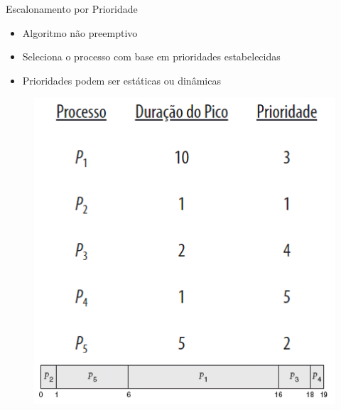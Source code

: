 \documentclass[aspectratio=169,
				xcolor=table]{beamer}
\begin{document}
	
	\begin{frame}{Escalonamento por Prioridade}
		\begin{itemize}
			\item Algoritmo não preemptivo 
			\vspace{0.5em}
			\item Seleciona o processo com base em prioridades estabelecidas
			\vspace{0.5em}
			\item Prioridades podem ser estáticas ou dinâmicas
						
		\end{itemize}
		\begin{figure}[hbtp]
		\centering
		\includegraphics[keepaspectratio, height=.6\textheight]{../figs/cap06/prioridade.png}
		\end{figure}			
	\end{frame}		
			
\end{document}
